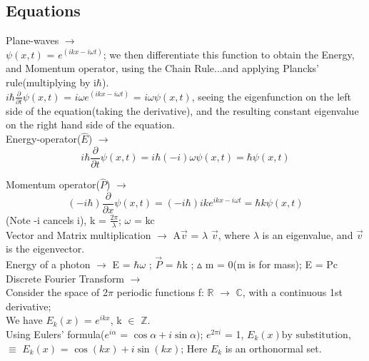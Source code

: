 \documentclass[a4paper, 10pt, onepage]{elegantbook}
\begin{document}
{\subsection{Equations}

Plane-waves $\longrightarrow$  \\

$\psi(x,t)$ = $e^{(ikx - i\omega t)}$; we then differentiate this function to obtain the
Energy, and Momentum operator, using the Chain Rule...and applying Plancks' rule(multiplying by i$\hbar$).  \\

$i \hbar \frac{\partial}{\partial t} \psi(x,t)$ = $i \omega e^{(ikx - i \omega t)}$ = $i \omega \psi(x,t)$, seeing the eigenfunction on the left side of the equation(taking the derivative), and the resulting constant eigenvalue on the right hand side of the equation.  \\

Energy-operator($\hat E$) $\rightarrow$
\begin{equation}
i \hbar \frac{\partial}{\partial t} \psi(x,t) = i \hbar(-i) \omega \psi(x,t) = \hbar \psi(x,t)
\end{equation}

Momentum operator($\hat P$) $\rightarrow$  \\
\begin{equation}
(-i \hbar) \frac{\partial}{\partial x} \psi(x,t) = ( -i \hbar) {ik}e^{ikx - i \omega t} =  \hbar k \psi(x,t)
\end{equation}
(Note -i cancels i), k = $\frac{2 \pi}{\lambda}$; $\omega$ = kc  \\

Vector and Matrix multiplication $\rightarrow$ A$\vec{v}$ = $ \lambda$ $\vec{v}$, where $\lambda$ is an eigenvalue, and $\vec{v}$ is the eigenvector. \\

Energy of a photon $\rightarrow$ E = $\hbar \omega$ ; $\vec{P}$ = $\hbar$k ; $\vartriangle$ m = 0(m is for mass); E = Pc \\

Discrete Fourier Transform $\rightarrow$  \\

Consider the space of 2$\pi$ periodic functions f: $\mathbb R$ $\rightarrow$ $\mathbb C$, with a continuous 1st derivative;  \\
We have $E_k(x)$ = $e^{ikx}$, k $\in$ $\mathbb Z$. \\
Using Eulers' formula($e^{i \alpha}$ = $\cos \alpha + i \sin \alpha)$; $e^{2 \pi i}$ = 1,
$E_k(x) \text{by substitution}$, $\equiv$ $E_k(x)$ = $\cos(kx) + i \sin(kx)$;  
Here $E_k$ is an orthonormal set.  \\

}
\end{document}
